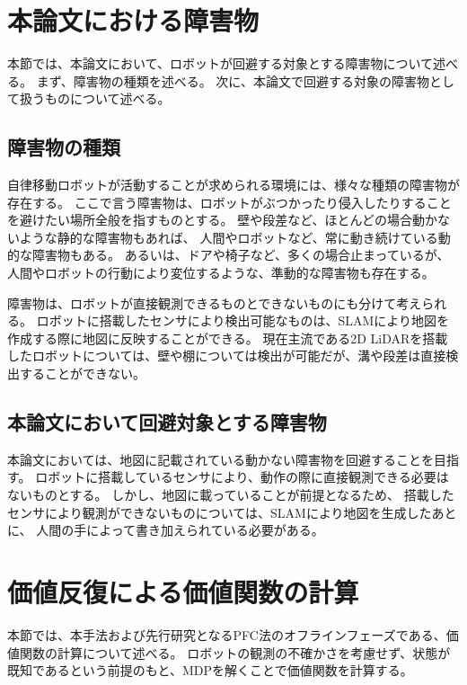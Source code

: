 \section{本論文における障害物} \label{section:障害物}
本節では、本論文において、ロボットが回避する対象とする障害物について述べる。
まず、障害物の種類を述べる。
次に、本論文で回避する対象の障害物として扱うものについて述べる。

\subsection{障害物の種類}
自律移動ロボットが活動することが求められる環境には、様々な種類の障害物が存在する。
ここで言う障害物は、ロボットがぶつかったり侵入したりすることを避けたい場所全般を指すものとする。
壁や段差など、ほとんどの場合動かないような静的な障害物もあれば、
人間やロボットなど、常に動き続けている動的な障害物もある。
あるいは、ドアや椅子など、多くの場合止まっているが、人間やロボットの行動により変位するような、準動的な障害物も存在する。

障害物は、ロボットが直接観測できるものとできないものにも分けて考えられる。
ロボットに搭載したセンサにより検出可能なものは、SLAMにより地図を作成する際に地図に反映することができる。
現在主流である2D LiDARを搭載したロボットについては、壁や棚については検出が可能だが、溝や段差は直接検出することができない。

\subsection{本論文において回避対象とする障害物}
本論文においては、地図に記載されている動かない障害物を回避することを目指す。
ロボットに搭載しているセンサにより、動作の際に直接観測できる必要はないものとする。
しかし、地図に載っていることが前提となるため、
搭載したセンサにより観測ができないものについては、SLAMにより地図を生成したあとに、
人間の手によって書き加えられている必要がある。


\section{価値反復による価値関数の計算} \label{section:価値関数}
本節では、本手法および先行研究となるPFC法のオフラインフェーズである、価値関数の計算について述べる。
ロボットの観測の不確かさを考慮せず、状態が既知であるという前提のもと、MDPを解くことで価値関数を計算する。

